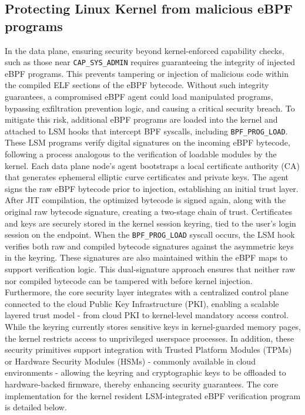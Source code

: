 \documentclass [11pt, proquest] {uwthesis}[2020/02/24]
\begin{document}
\subsection{Protecting Linux Kernel from malicious eBPF programs}
In the data plane, ensuring security beyond kernel-enforced capability checks, such as those near \texttt{CAP\_SYS\_ADMIN} requires guaranteeing the integrity of injected eBPF programs. This prevents tampering or injection of malicious code within the compiled ELF sections of the eBPF bytecode. Without such integrity guarantees, a compromised eBPF agent could load manipulated programs, bypassing exfiltration prevention logic, and causing a critical security breach.
To mitigate this risk, additional eBPF programs are loaded into the kernel and attached to LSM hooks that intercept BPF syscalls, including  \texttt{BPF\_PROG\_LOAD}. These LSM programs verify digital signatures on the incoming eBPF bytecode, following a process analogous to the verification of loadable modules by the kernel.
Each data plane node’s agent bootstraps a local certificate authority (CA) that generates ephemeral elliptic curve certificates and private keys. The agent signs the raw eBPF bytecode prior to injection, establishing an initial trust layer. After JIT compilation, the optimized bytecode is signed again, along with the original raw bytecode signature, creating a two-stage chain of trust. Certificates and keys are securely stored in the kernel session keyring, tied to the user’s login session on the endpoint.
When the \texttt{BPF\_PROG\_LOAD} syscall occurs, the LSM hook verifies both raw and compiled bytecode signatures against the asymmetric keys in the keyring. These signatures are also maintained within the eBPF maps to support verification logic. This dual-signature approach ensures that neither raw nor compiled bytecode can be tampered with before kernel injection.
Furthermore, the core security layer integrates with a centralized control plane connected to the cloud Public Key Infrastructure (PKI), enabling a scalable layered trust model - from cloud PKI to kernel-level mandatory access control. While the keyring currently stores sensitive keys in kernel-guarded memory pages, the kernel restricts access to unprivileged userspace processes. In addition, these security primitives support integration with Trusted Platform Modules (TPMs) or Hardware Security Modules (HSMs) - commonly available in cloud environments - allowing the keyring and cryptographic keys to be offloaded to hardware-backed firmware, thereby enhancing security guarantees. The core implementation for the kernel resident LSM-integrated eBPF verification program is detailed below.
\end{document}
